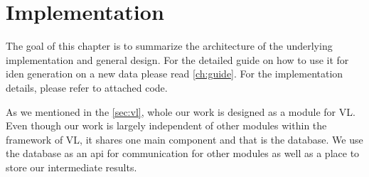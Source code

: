 \chapter{Implementation}

The goal of this chapter is to summarize the architecture of the underlying implementation and general design. For the detailed guide on how to use it for \gls{iden} generation on a new data please read \autoref{ch:guide}. For the implementation details, please refer to attached code.

As we mentioned in the \autoref{sec:vl}, whole our work is designed as a module for \gls{VL}. Even though our work is largely independent of other modules within the framework of \gls{VL}, it shares one main component and that is the database. We use the database as an \gls{api} for communication for other modules as well as a place to store our intermediate results.